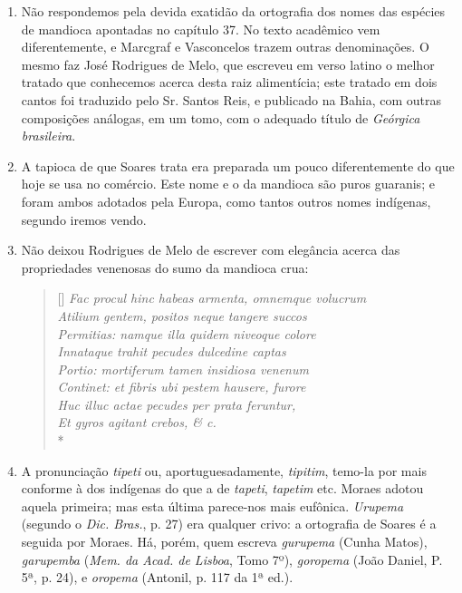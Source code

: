\begin{enumerate}
\item Não respondemos pela devida exatidão da ortografia dos nomes das espécies de 
mandioca apontadas no capítulo 37. No texto acadêmico vem diferentemente, e 
Marcgraf e Vasconcelos trazem outras denominações. O mesmo faz José Rodrigues de 
Melo, que escreveu em verso latino o melhor tratado que conhecemos acerca desta raiz 
alimentícia; este tratado em dois cantos foi traduzido pelo Sr. Santos Reis, e 
publicado na Bahia, com outras composições análogas, em um tomo, com o adequado 
título de \textit{Geórgica brasileira}.

\item A tapioca de que Soares trata era preparada um pouco diferentemente do que hoje 
se usa no comércio. Este nome e o da mandioca são puros guaranis; e foram ambos 
adotados pela Europa, como tantos outros nomes indígenas, segundo iremos vendo.

\item Não deixou Rodrigues de Melo de escrever com elegância acerca das 
propriedades venenosas do sumo da mandioca crua: 

\settowidth{\versewidth}{Fac procul hinc habeas armenta, omnemque volucrum}
\begin{verse}[\versewidth]
\textit{Fac procul hinc habeas armenta, omnemque volucrum \\
Atilium gentem, positos neque tangere succos \\
Permitias: namque illa quidem niveoque colore \\
Innataque trahit pecudes dulcedine captas \\
Portio: mortiferum tamen insidiosa venenum \\
Continet: et fibris ubi pestem hausere, furore \\
Huc illuc actae pecudes per prata feruntur, \\
Et gyros agitant crebos, \& c.}\\*
\end{verse}

\item  A pronunciação \textit{tipeti} ou, aportuguesadamente, \textit{tipitim}, temo-la por
mais conforme à dos indígenas do que a de \textit{tapeti}, \textit{tapetim} etc. Moraes
adotou aquela primeira; mas esta última parece-nos mais eufônica. \textit{Urupema}
(segundo o \textit{Dic. Bras.}, p. 27) era qualquer crivo: a ortografia de Soares é
a seguida por Moraes. Há, porém, quem escreva \textit{gurupema} (Cunha Matos), \textit{garupemba} 
(\textit{Mem. da Acad. de Lisboa}, Tomo 7º), \textit{goropema} (João Daniel, P. 5ª, p. 24), e \textit{oropema} 
(Antonil, p. 117 da 1ª ed.).


\end{enumerate}
